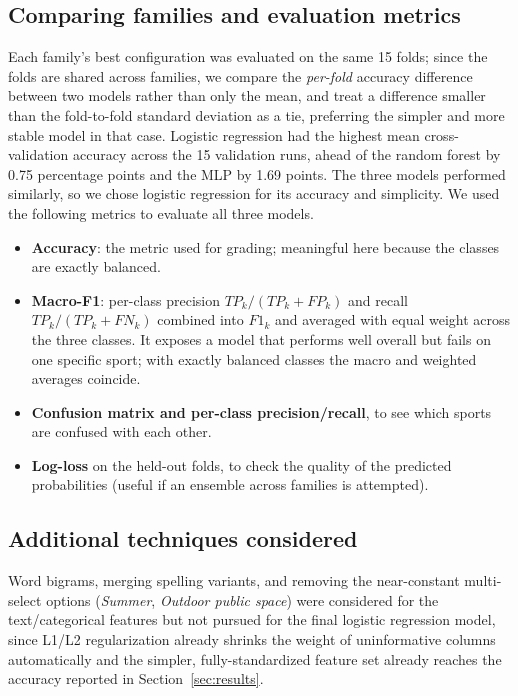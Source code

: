 \documentclass[12pt]{article}
\begin{document}
\subsection{Comparing families and evaluation metrics}

Each family's best configuration was evaluated on the same 15 folds; since the folds are
shared across families, we compare the \emph{per-fold} accuracy difference between two models
rather than only the mean, and treat a difference smaller than the fold-to-fold standard
deviation as a tie, preferring the simpler and more stable model in that case.
Logistic regression had the highest mean cross-validation accuracy across the 15 validation runs, 
ahead of the random forest by 0.75 percentage points and the MLP by 1.69 points. The three models 
performed similarly, so we chose logistic regression for its accuracy and simplicity.
We used the following metrics to evaluate all three models.

\begin{itemize}
\item \textbf{Accuracy}: the metric used for grading; meaningful here because the classes are
exactly balanced.
\item \textbf{Macro-F1}: per-class precision $TP_k/(TP_k+FP_k)$ and recall
$TP_k/(TP_k+FN_k)$ combined into $F1_k$ and averaged with equal weight across the three classes.
It exposes a model that performs well overall but fails on one specific sport; with exactly
balanced classes the macro and weighted averages coincide.
\item \textbf{Confusion matrix and per-class precision/recall}, to see which sports are
confused with each other.
\item \textbf{Log-loss} on the held-out folds, to check the quality of the predicted
probabilities (useful if an ensemble across families is attempted).
\end{itemize}

\subsection{Additional techniques considered}\label{sec:forest-text}

Word bigrams, merging spelling variants, and removing the near-constant multi-select options
(\emph{Summer}, \emph{Outdoor public space}) were considered for the text/categorical features but
not pursued for the final logistic regression model, since L1/L2 regularization already shrinks
the weight of uninformative columns automatically and the simpler, fully-standardized feature set
already reaches the accuracy reported in Section~\ref{sec:results}.
\end{document}
